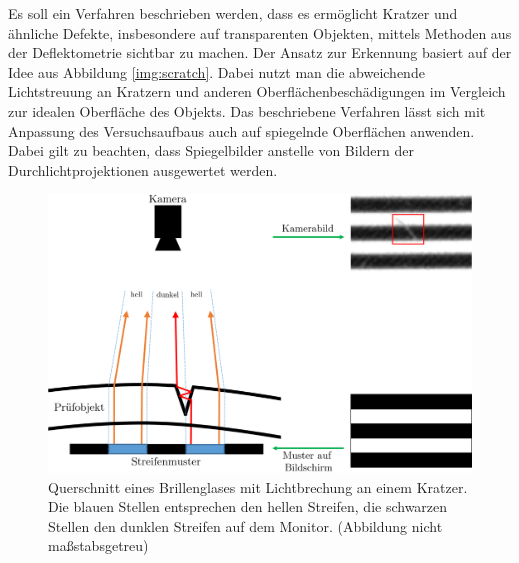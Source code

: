 Es soll ein Verfahren beschrieben werden, dass es ermöglicht Kratzer und ähnliche Defekte, insbesondere auf transparenten Objekten, mittels Methoden aus der Deflektometrie sichtbar zu machen.
Der Ansatz zur Erkennung basiert auf der Idee aus Abbildung \ref{img:scratch}.
Dabei nutzt man die abweichende Lichtstreuung an Kratzern und anderen Oberflächenbeschädigungen im Vergleich zur idealen Oberfläche des Objekts.
Das beschriebene Verfahren lässt sich mit Anpassung des Versuchsaufbaus auch auf spiegelnde Oberflächen anwenden.
Dabei gilt zu beachten, dass Spiegelbilder anstelle von Bildern der Durchlichtprojektionen ausgewertet werden.

\begin{figure}[H]
	\centering
	\includegraphics[width=\textwidth]{03_sichtpruefungDurchLichtstreuung/verfahren/figures/scratch_reflection_with_images}
	\caption[Lichtbrechung an einem Kratzer]{Querschnitt eines Brillenglases mit Lichtbrechung an einem Kratzer. Die blauen Stellen entsprechen den hellen Streifen, die schwarzen Stellen den dunklen Streifen auf dem Monitor. (Abbildung nicht maßstabsgetreu)}
	\label{img:lightreflection}
\end{figure}

